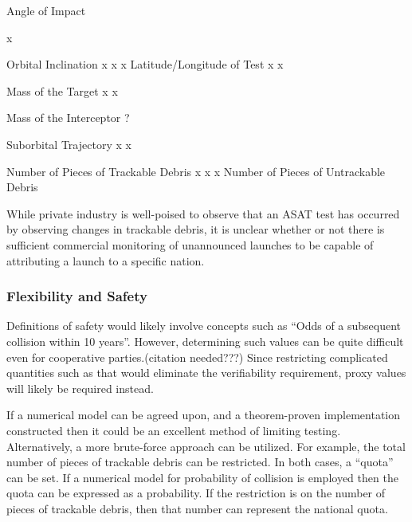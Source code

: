 Angle of Impact


x


Orbital Inclination
x
x
x
Latitude/Longitude of Test
x
x


Mass of the Target
x
x


Mass of the Interceptor
?




Suborbital Trajectory
x
x


Number of Pieces of Trackable Debris
x
x
x
Number of Pieces of Untrackable Debris








While private industry is well-poised to observe that an ASAT test has occurred by observing changes in trackable debris, it is unclear whether or not there is sufficient commercial monitoring of unannounced launches to be capable of attributing a launch to a specific nation.

\subsubsection{Flexibility and Safety}
Definitions of safety would likely involve concepts such as ``Odds of
a subsequent collision within 10 years''.  However, determining such
values can be quite difficult even for cooperative parties.(citation
needed???)  Since restricting complicated quantities such as that
would eliminate the verifiability requirement, proxy values will
likely be required instead.

If a numerical model can be agreed upon, and a theorem-proven
implementation constructed then it could be an excellent method of
limiting testing.  Alternatively, a more brute-force approach can be
utilized.  For example, the total number of pieces of trackable debris
can be restricted.  In both cases, a ``quota'' can be set.  If a
numerical model for probability of collision is employed then the
quota can be expressed as a probability.  If the restriction is on the
number of pieces of trackable debris, then that number can represent
the national quota.

